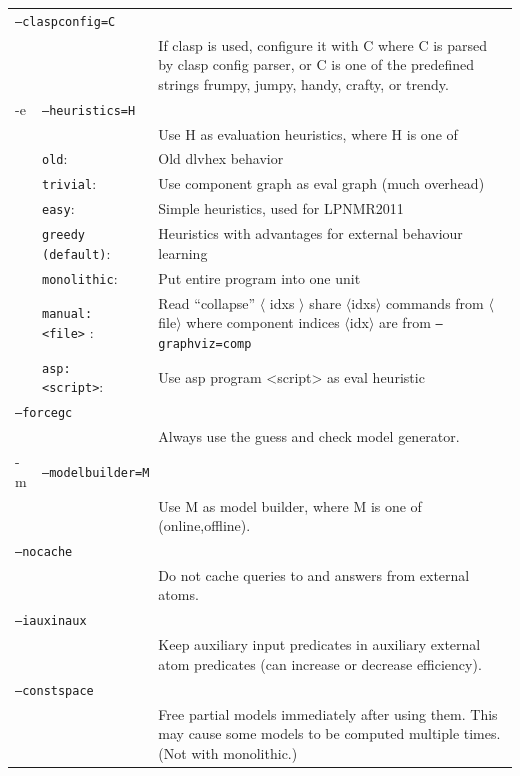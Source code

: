 \documentclass[a4paper, titlepage]{article}
\begin{document}
\begin{center}
\begin{longtable}{p{0.7cm}  p{2.2cm} p{0.3cm} p{6.3cm}  }
\multicolumn{4}{l}{\texttt{--claspconfig=C}}\\
& & & If clasp is used, configure it with C where C is parsed by clasp config parser, or C is one of the predefined strings frumpy, jumpy, handy, crafty, or trendy.\\
-e& \multicolumn{3}{l}{\texttt{--heuristics=H}}\\
& & & Use H as evaluation heuristics, where H is one of\\
&\texttt{old}:&&Old dlvhex behavior\\
&\texttt{trivial}:&&Use component graph as eval graph (much overhead)\\
&\texttt{easy}:&&Simple heuristics, used for LPNMR2011\\
&\texttt{greedy (default)}:&& Heuristics with advantages for external behaviour learning\\
&\texttt{monolithic}:&& Put entire program into one unit\\
&\texttt{manual:<file>} :&&  Read ``collapse'' $\langle$ idxs $\rangle$ share $\langle$idxs$\rangle$ commands from $\langle$file$\rangle$ where component indices $\langle$idx$\rangle$ are from \texttt{--graphviz=comp}\\
&\texttt{asp:<script>}:&&Use asp program <script> as eval heuristic\\
\multicolumn{4}{l}{\texttt{--forcegc}}\\
& & & Always use the guess and check model generator.\\
-m& \multicolumn{3}{l}{\texttt{--modelbuilder=M}}\\
& & & Use M as model builder, where M is one of (online,offline).\\
\multicolumn{4}{l}{\texttt{--nocache}}\\
& & &Do not cache queries to and answers from external atoms.\\
\multicolumn{4}{l}{\texttt{--iauxinaux}}\\
& & &Keep auxiliary input predicates in auxiliary external atom predicates (can increase or decrease efficiency).\\
\multicolumn{4}{l}{\texttt{--constspace}}\\
& & &Free partial models immediately after using them. This may cause some models to be computed multiple times. (Not with monolithic.)\\
\end{longtable}
\end{center}
\end{document}

